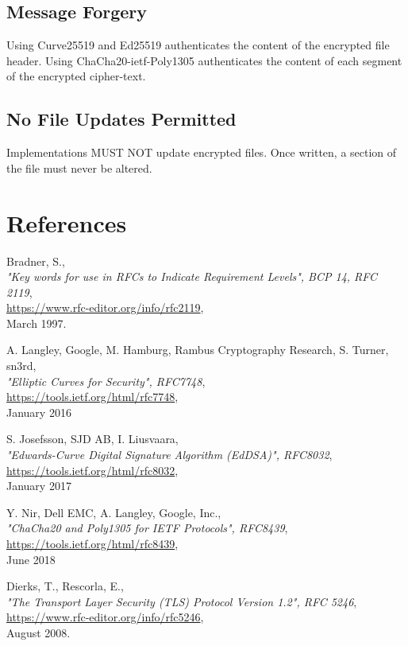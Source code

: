\documentclass[10pt]{article}
\begin{document}
\subsection{Message Forgery}
Using Curve25519 and Ed25519 authenticates the content of the encrypted file header.
Using ChaCha20-ietf-Poly1305 authenticates the content of each segment of the encrypted cipher-text.

\subsection{No File Updates Permitted}
Implementations MUST NOT update encrypted files.
Once written, a section of the file must never be altered.

\section{References}

\begin{thebibliography}{XXXXXXX}


  Bradner, S.,\\
  \emph{"Key words for use in RFCs to Indicate Requirement Levels", BCP 14, RFC 2119},\\
  \url{https://www.rfc-editor.org/info/rfc2119},\\
  March 1997.

  A. Langley, Google, M. Hamburg, Rambus Cryptography Research, S. Turner, sn3rd,\\
  \emph{"Elliptic Curves for Security", RFC7748},\\
  \url{https://tools.ietf.org/html/rfc7748},\\
  January 2016

  S. Josefsson, SJD AB, I. Liusvaara,\\
  \emph{"Edwards-Curve Digital Signature Algorithm (EdDSA)", RFC8032},\\
  \url{https://tools.ietf.org/html/rfc8032},\\
  January 2017

  Y. Nir, Dell EMC, A. Langley, Google, Inc.,\\
  \emph{"ChaCha20 and Poly1305 for IETF Protocols", RFC8439},\\
  \url{https://tools.ietf.org/html/rfc8439},\\
  June 2018


  Dierks, T., Rescorla, E.,\\
  \emph{"The Transport Layer Security (TLS) Protocol Version 1.2", RFC 5246},\\
  \url{https://www.rfc-editor.org/info/rfc5246},\\
  August 2008.

\end{thebibliography}
\end{document}

